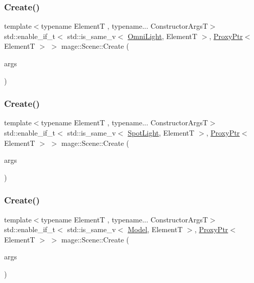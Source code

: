 \subsubsection{\texorpdfstring{Create()}{Create()}\hspace{0.1cm}{\footnotesize\ttfamily [6/11]}}
{\footnotesize\ttfamily template$<$typename ElementT , typename... Constructor\+ArgsT$>$ \\
std\+::enable\+\_\+if\+\_\+t$<$ std\+::is\+\_\+same\+\_\+v$<$ \hyperlink{classmage_1_1_omni_light}{Omni\+Light}, ElementT $>$, \hyperlink{classmage_1_1_proxy_ptr}{Proxy\+Ptr}$<$ ElementT $>$ $>$ mage\+::\+Scene\+::\+Create (\begin{DoxyParamCaption}\item[{Constructor\+ArgsT \&\&...}]{args }\end{DoxyParamCaption})}

\hypertarget{classmage_1_1_scene_a2e1eb9d8c9fcc7d5722e4c499497d86f}{}\label{classmage_1_1_scene_a2e1eb9d8c9fcc7d5722e4c499497d86f} 
\subsubsection{\texorpdfstring{Create()}{Create()}\hspace{0.1cm}{\footnotesize\ttfamily [7/11]}}
{\footnotesize\ttfamily template$<$typename ElementT , typename... Constructor\+ArgsT$>$ \\
std\+::enable\+\_\+if\+\_\+t$<$ std\+::is\+\_\+same\+\_\+v$<$ \hyperlink{classmage_1_1_spot_light}{Spot\+Light}, ElementT $>$, \hyperlink{classmage_1_1_proxy_ptr}{Proxy\+Ptr}$<$ ElementT $>$ $>$ mage\+::\+Scene\+::\+Create (\begin{DoxyParamCaption}\item[{Constructor\+ArgsT \&\&...}]{args }\end{DoxyParamCaption})}

\hypertarget{classmage_1_1_scene_a0f8724805acbb6ae4ca5155306154ab1}{}\label{classmage_1_1_scene_a0f8724805acbb6ae4ca5155306154ab1} 
\subsubsection{\texorpdfstring{Create()}{Create()}\hspace{0.1cm}{\footnotesize\ttfamily [8/11]}}
{\footnotesize\ttfamily template$<$typename ElementT , typename... Constructor\+ArgsT$>$ \\
std\+::enable\+\_\+if\+\_\+t$<$ std\+::is\+\_\+same\+\_\+v$<$ \hyperlink{classmage_1_1_model}{Model}, ElementT $>$, \hyperlink{classmage_1_1_proxy_ptr}{Proxy\+Ptr}$<$ ElementT $>$ $>$ mage\+::\+Scene\+::\+Create (\begin{DoxyParamCaption}\item[{Constructor\+ArgsT \&\&...}]{args }\end{DoxyParamCaption})}

